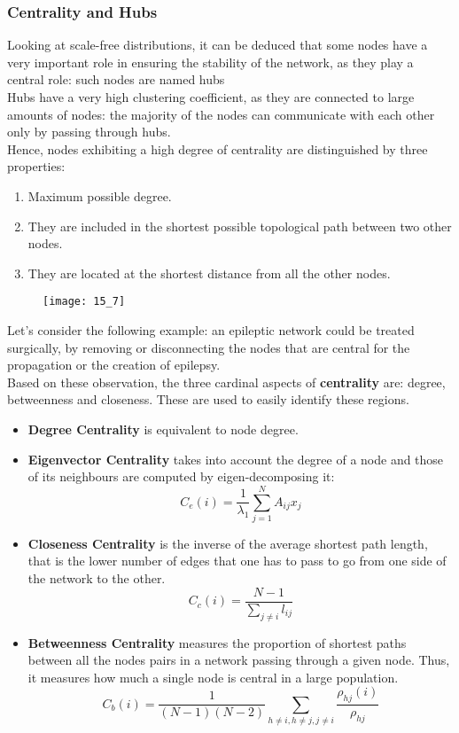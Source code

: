\subsubsection{Centrality and Hubs}
Looking at scale-free distributions, it can be deduced that some nodes have a very important role in ensuring the
stability of the network, as they play a central role: such nodes are named hubs\\
Hubs have a very high clustering coefficient, as they are connected to large amounts of nodes:
the majority of the nodes can communicate with each other only by passing through hubs.\\
Hence, nodes exhibiting a high degree of centrality are distinguished by three properties:
\begin{enumerate}
    \item Maximum possible degree.
    \item They are included in the shortest possible topological path between two other nodes.
    \item They are located at the shortest distance from all the other nodes.
\end{enumerate}
\begin{figure}[H]
    \centering
    \texttt{[image: 15\_7]}
\end{figure}
Let's consider the following example: an epileptic network could be treated surgically, by removing or disconnecting the
nodes that are central for the propagation or the creation of epilepsy.\\
Based on these observation, the three cardinal aspects of \textbf{centrality} are: degree, betweenness and closeness.
These are used to easily identify these regions.
\begin{itemize}
    \item \textbf{Degree Centrality} is equivalent to node degree.
    \item \textbf{Eigenvector Centrality} takes into account the degree of a node and those of its neighbours are computed
          by eigen-decomposing it:
          \begin{equation*}
              C_e(i)=\frac{1}{\lambda_1}\sum_{j=1}^NA_{ij}x_j
          \end{equation*}
    \item \textbf{Closeness Centrality} is the inverse of the average shortest path length, that is the lower number
          of edges that one has to pass to go from one side of the network to the other.
          \begin{equation*}
              C_c(i)=\frac{N-1}{\sum_{j\neq i}l_{ij}}
          \end{equation*}
    \item \textbf{Betweenness Centrality} measures the proportion of shortest paths between all the nodes pairs in a
          network passing through a given node. Thus, it measures how much a single node is central in a large population.
          \begin{equation*}
              C_b(i)=\frac{1}{(N-1)(N-2)}\sum_{h\neq i,h\neq j, j\neq i} \frac{\rho_{hj}(i)}{\rho_{hj}}
          \end{equation*}
\end{itemize}
